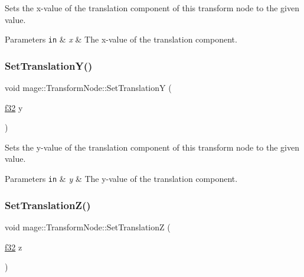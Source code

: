Sets the x-\/value of the translation component of this transform node to the given value.


\begin{DoxyParams}[1]{Parameters}
\mbox{\tt in}  & {\em x} & The x-\/value of the translation component. \\
\hline
\end{DoxyParams}
\hypertarget{structmage_1_1_transform_node_a63a4053865899238eccdae792371b673}{}\label{structmage_1_1_transform_node_a63a4053865899238eccdae792371b673} 
\subsubsection{\texorpdfstring{Set\+Translation\+Y()}{SetTranslationY()}}
{\footnotesize\ttfamily void mage\+::\+Transform\+Node\+::\+Set\+TranslationY (\begin{DoxyParamCaption}\item[{\hyperlink{namespacemage_a6a44ad388483959dc4dff9f2aef91431}{f32}}]{y }\end{DoxyParamCaption})\hspace{0.3cm}{\ttfamily [noexcept]}}

Sets the y-\/value of the translation component of this transform node to the given value.


\begin{DoxyParams}[1]{Parameters}
\mbox{\tt in}  & {\em y} & The y-\/value of the translation component. \\
\hline
\end{DoxyParams}
\hypertarget{structmage_1_1_transform_node_add41711dd9b72a791b7cb3b01e2f931f}{}\label{structmage_1_1_transform_node_add41711dd9b72a791b7cb3b01e2f931f} 
\subsubsection{\texorpdfstring{Set\+Translation\+Z()}{SetTranslationZ()}}
{\footnotesize\ttfamily void mage\+::\+Transform\+Node\+::\+Set\+TranslationZ (\begin{DoxyParamCaption}\item[{\hyperlink{namespacemage_a6a44ad388483959dc4dff9f2aef91431}{f32}}]{z }\end{DoxyParamCaption})\hspace{0.3cm}{\ttfamily [noexcept]}}

